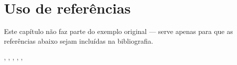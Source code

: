 \documentclass[ppgc,diss]{iiufrgs}
\begin{document}
\chapter{Uso de referências}
Este capítulo não faz parte do exemplo original --- serve apenas para que as
referências abaixo sejam incluídas na bibliografia.

\cite{goncalves}, \cite{lisboa}, \cite{high}, \cite{krieger},
\cite{goncalves2}, \cite{pedrosa}




\end{document}
